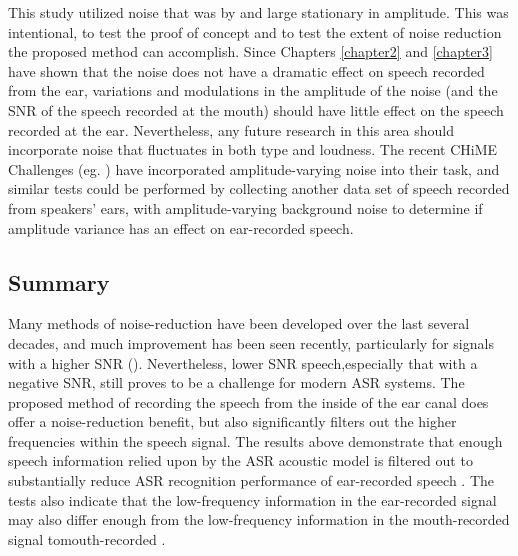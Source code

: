 This study utilized noise that was by and large stationary in amplitude.  This was intentional, to test the proof of concept and to test the extent of noise reduction the proposed method can accomplish.  Since Chapters \ref{chapter2} and \ref{chapter3} have shown that the noise does not have a dramatic effect on speech recorded from the ear, variations and modulations in the amplitude of the noise (and the SNR of the speech recorded at the mouth) should have little effect on the speech recorded at the ear.  Nevertheless, any future research in this area should incorporate noise that fluctuates in both type and loudness.  The recent CHiME Challenges (eg. \cite{chime:16}) have incorporated amplitude-varying noise into their task, and similar tests could be performed by collecting another data set of speech recorded from speakers' ears, with amplitude-varying background noise to determine if amplitude variance has an effect on ear-recorded speech.

\subsection{Summary}
\label{chap4:summary}

Many methods of noise-reduction have been developed over the last several decades, and much improvement has been seen recently, particularly for signals with a higher SNR (\cite{zhang:17}).  Nevertheless, lower SNR speech,especially that with a negative SNR, still proves to be a challenge for modern ASR systems.  The proposed method of recording the speech from the inside of the ear canal does offer a noise-reduction benefit, but also significantly filters out the higher frequencies within the speech signal.  The results above demonstrate that enough speech information relied upon by the ASR acoustic model is filtered out to substantially reduce ASR recognition performance of ear-recorded speech \DIFaddbegin {}\DIFaddend .  The tests also indicate that the low-frequency information in the ear-recorded signal may also differ enough from the low-frequency information in the mouth-recorded signal to\DIFdelbegin {}\DIFdelend \DIFaddbegin {}\DIFaddend mouth-recorded \DIFdelbegin {}\DIFdelend \DIFaddbegin {}\DIFaddend .  

